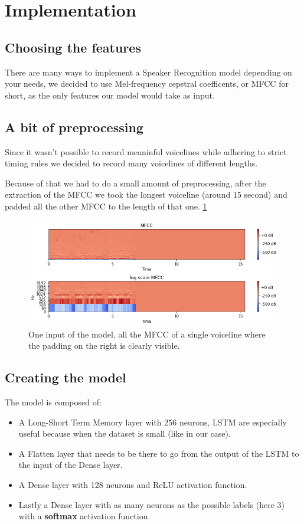 \documentclass{article}
\begin{document}
\section{Implementation}
	\subsection{Choosing the features}
	There are many ways to implement a Speaker Recognition model depending on your needs, 
	we decided to use Mel-frequency cepstral coefficents, or MFCC for short, as the only features our model would take as input.

	\subsection{A bit of preprocessing}
	Since it wasn't possible to record meaninful voicelines while adhering to strict timing rules we decided to record many voicelines of different lengths.
	
	Because of that we had to do a small amount of preprocessing, after the extraction of the MFCC we took the longest voiceline (around 15 second) 
	and padded all the other MFCC to the length of that one. \ref{fig:mfcc}

	\begin{figure}
	\centering
	\includegraphics[width = \textwidth]{mfcc}
	\caption{One input of the model, all the MFCC of a single voiceline where the padding on the right is clearly visible.}
	\label{fig:mfcc}
	\end{figure}

	\subsection{Creating the model}
	The model is composed of:
	\begin{itemize}
	\item A Long-Short Term Memory layer with 256 neurons, LSTM are especially useful because when the dataset is small (like in our case).
	\item A Flatten layer that needs to be there to go from the output of the LSTM to the input of the Dense layer.
	\item A Dense layer with 128 neurons and ReLU activation function.
	\item Lastly a Dense layer with as many neurons as the possible labels (here 3) with a {\bf softmax} activation function.
	\end{itemize}
\end{document}
